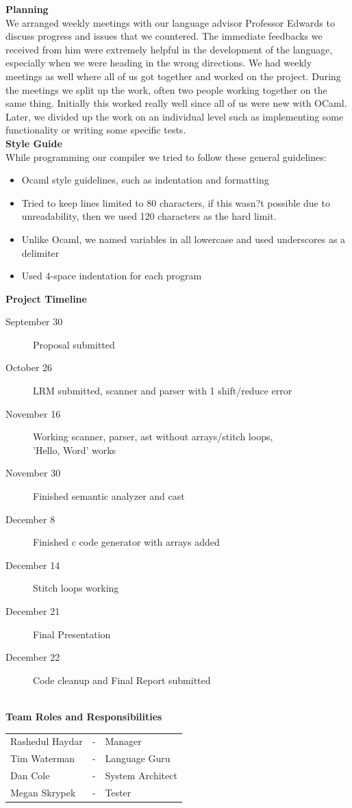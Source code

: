 \documentclass[11pt, oneside]{article}   	%
\newcommand{\tab} {\hspace*{2em}}
\begin{document}
\Large\textbf{Planning}\\[1em]
\normalsize
We arranged weekly meetings with our language advisor Professor Edwards to discuss progress and issues that we countered. The immediate feedbacks we received from him were extremely helpful in the development of the language, especially when we were heading in the wrong directions. We had weekly meetings as well where all of us got together and worked on the project. During the meetings we split up the work, often two people working together on the same thing. Initially this worked really well since all of us were new with OCaml. Later, we divided up the work on an individual level such as implementing some functionality or writing some specific tests.\\[3em]
\Large\textbf{Style Guide}\\[1em]
\normalsize
While programming our compiler we tried to follow these general guidelines:
\begin{itemize}
  \item Ocaml style guidelines, such as indentation and formatting
  \item Tried to keep lines limited to 80 characters, if this wasn?t possible due to unreadability, then we used 120 characters as the hard limit.
  \item Unlike Ocaml, we named variables in all lowercase and used underscores as a delimiter
  \item Used 4-space indentation for each program 
\end{itemize}
\newpage
\Large\textbf{Project Timeline}\\[0em]
\normalsize
\tab\begin{description}
  \item[September 30] Proposal submitted
  \item[October 26] LRM submitted, scanner and parser with 1 shift/reduce error
  \item[November 16] Working scanner, parser, ast without arrays/stitch loops, \\[.5em]'Hello, Word' works
  \item[November 30] Finished semantic analyzer and cast
  \item[December 8] Finished c code generator with arrays added
  \item[December 14] Stitch loops working 
  \item[December 21] Final Presentation
  \item[December 22] Code cleanup and Final Report submitted 
\end{description}
\tab\\[3em]
\Large\textbf{Team Roles and Responsibilities}\\[1em]
\normalsize
\tab\begin{tabular}{l c l}
Rashedul Haydar & - & Manager\\
Tim Waterman & - & Language Guru\\
Dan Cole & - & System Architect\\
Megan Skrypek & - & Tester\\
\end{tabular}\\
\end{document}
